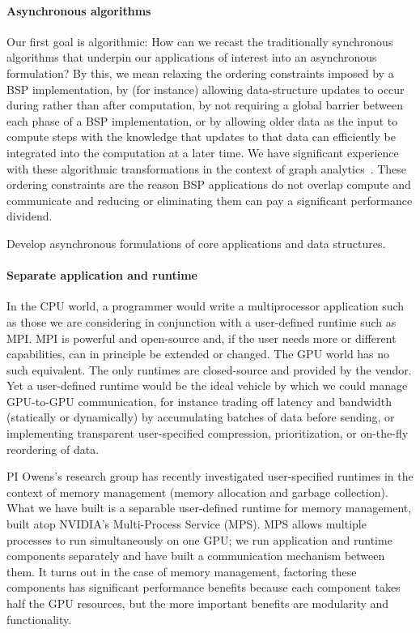 \paragraph{Asynchronous algorithms}
Our first goal is algorithmic: How can we recast the traditionally synchronous algorithms that underpin our applications of interest into an asynchronous formulation? By this, we mean relaxing the ordering constraints imposed by a BSP implementation, by (for instance) allowing data-structure updates to occur during rather than after computation, by not requiring a global barrier between each phase of a BSP implementation, or by allowing older data as the input to compute steps with the knowledge that updates to that data can efficiently be integrated into the computation at a later time. We have significant experience with these algorithmic transformations in the context of graph analytics~\cite{Chen:2022:AAT,Chen:2022:SIP}. These ordering constraints are the reason BSP applications do not overlap compute and communicate and reducing or eliminating them can pay a significant performance dividend.

\begin{rproblem}
Develop asynchronous formulations of core applications and data structures.
\end{rproblem}

\paragraph{Separate application and runtime}
In the CPU world, a programmer would write a multiprocessor application such as those we are considering in conjunction with a user-defined runtime such as MPI\@. MPI is powerful and open-source and, if the user needs more or different capabilities, can in principle be extended or changed. The GPU world has no such equivalent. The only runtimes are closed-source and provided by the vendor. Yet a user-defined runtime would be the ideal vehicle by which we could manage GPU-to-GPU communication, for instance trading off latency and bandwidth (statically or dynamically) by accumulating batches of data before sending, or implementing transparent user-specified compression, prioritization, or on-the-fly reordering of data.

PI Owens's research group has recently investigated user-specified runtimes in the context of memory management (memory allocation and garbage collection). What we have built is a separable user-defined runtime for memory management, built atop NVIDIA's Multi-Process Service (MPS)\@. MPS allows multiple processes to run simultaneously on one GPU; we run application and runtime components separately and have built a communication mechanism between them. It turns out in the case of memory management, factoring these components has significant performance benefits because each component takes half the GPU resources, but the more important benefits are modularity and functionality.


